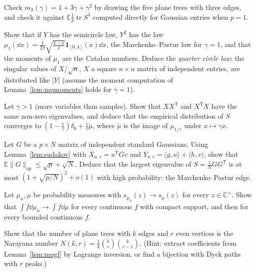 \begin{exercise}[$\star$]\label{ex:mpsmall}
Check $m_3(\gamma)=1+3\gamma+\gamma^2$ by drawing the five plane trees with three edges, and check it against $\mathbb E\frac1p\operatorname{tr}S^3$ computed directly for Gaussian entries when $p=1$.
\end{exercise}

\begin{exercise}[$\star\star$]\label{ex:quartercircle}
Show that if $Y$ has the semicircle law, $Y^2$ has the law $\mu_1(\dd x)=\frac1{2\pi}\sqrt{\frac{4-x}x}\mathbf 1_{[0,4]}(x)\dd x$, the Marchenko--Pastur law for $\gamma=1$, and that the moments of $\mu_1$ are the Catalan numbers. Deduce the
\emph{quarter circle law}: the singular values of $X/\sqrt n$, $X$ a square $n\times n$ matrix of independent entries, are distributed like $|Y|$ (assume the moment computation of Lemma~\ref{lem:mpmoments} holds for $\gamma=1$).
\end{exercise}

\begin{exercise}[$\star\star$]\label{ex:wide}
Let $\gamma>1$ (more variables than samples). Show that $XX^{\mathsf T}$ and $X^{\mathsf T}X$ have the same non-zero eigenvalues, and deduce that the empirical distribution of $S$ converges to
$(1-\frac1\gamma)\delta_0+\frac1\gamma\tilde\mu$, where $\tilde\mu$ is the image of $\mu_{1/\gamma}$ under $x\mapsto\gamma x$.
\end{exercise}

\begin{exercise}[$\star\star$]\label{ex:gordon}
Let $G$ be a $p\times N$ matrix of independent standard Gaussians. Using Lemma~\ref{lem:sudakov} with $X_{u,v}=u^{\mathsf T}Gv$ and $Y_{u,v}=\langle g,u\rangle+\langle h,v\rangle$, show that $\mathbb E\|G\|_{\mathrm{op}}\le\sqrt p+\sqrt N$. Deduce that the
largest eigenvalue of $S=\frac1NGG^{\mathsf T}$ is at most $(1+\sqrt{p/N})^2+o(1)$ with high probability: the Marchenko--Pastur edge.
\end{exercise}

\begin{exercise}[$\star\star$]\label{ex:stieltjesconv}
Let $\mu_n,\mu$ be probability measures with $s_{\mu_n}(z)\to s_\mu(z)$ for every $z\in\mathbb C^+$. Show that $\int f\dd\mu_n\to\int f\dd\mu$ for every continuous $f$ with compact support, and then for every bounded continuous $f$.
\end{exercise}

\begin{exercise}[$\star\star\star$]\label{ex:narayana}
Show that the number of plane trees with $k$ edges and $r$ even vertices is the Narayana number $N(k,r)=\frac1k\binom kr\binom k{r-1}$. (Hint: extract coefficients from Lemma~\ref{lem:mpgf} by Lagrange inversion, or find a bijection with
Dyck paths with $r$ peaks.)
\end{exercise}

